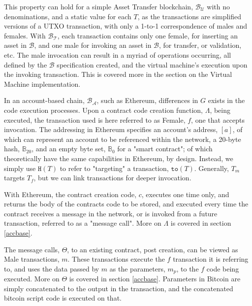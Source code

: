 \documentclass[12pt, titlepage, twocolumn]{report}
\begin{document}
This property can hold for a simple Asset Transfer blockchain, \(\boldsymbol{\mathcal{B}}_{\mathcal{U}}\) with no denominations, and a static value for each \(T\), as the transactions are simplified versions of a UTXO transaction, with only a 1-to-1 correspondence of males and females. With \(\boldsymbol{\mathcal{B}}_{\mathcal{T}}\), each transaction contains only one female, for inserting an asset in \(\boldsymbol{\mathcal{B}}\), and one male for invoking an asset in \(\boldsymbol{\mathcal{B}}\), for transfer, or validation, etc. The male invocation can result in a myriad of operations occurring, all defined by the  \(\boldsymbol{\mathcal{B}}\) specification created, and the virtual machine's execution upon the invoking transaction. This is covered more in the section on the Virtual Machine implementation.

In an account-based chain, \(\boldsymbol{\mathcal{B}}_{\mathcal{A}}\), such as Ethereum, differences in \(G\) exists in the code execution processes. Upon a contract code creation function, \(\Lambda\), being executed, the transaction used is here referred to as Female, \(f\), one that accepts invocation. The addressing in Ethereum specifies an account's address, \([a]\), of which can represent an account to be referenced within the network, a 20-byte hash, \(\mathbb{B}_{20}\), and an empty byte set, \(\mathbb{B}_{0}\) for a "smart contract"; of which theoretically have the same capabilities in Ethereum, by design. Instead, we simply use \(\boldsymbol{\texttt{H}}(T)\) to refer to "targeting" a transaction, \(\texttt{to}(T)\). Generally, \(T_m\) targets \(T_f\), but we can link transactions for deeper invocation.



With Ethereum, the contract creation code, \(c\), executes one time only, and returns the body of the contracts code to be stored, and executed every time the contract receives a message in the network, or is invoked from a future transaction, referred to as a "message call". More on \(\Lambda\) is covered in section \ref{accbase}.

The message calls, \(\Theta\), to an existing contract, post creation, can be viewed as Male transactions, \(m\). These transactions execute the \(f\) transaction it is referring to, and uses the data passed by \(m\) as the parameters, \(m_p\), to the \(f\) code being executed. More on \(\Theta\) is covered in section \ref{accbase}. Parameters in Bitcoin are simply concatenated to the output in the transaction, and the concatenated bitcoin script code is executed on that.
\end{document}
